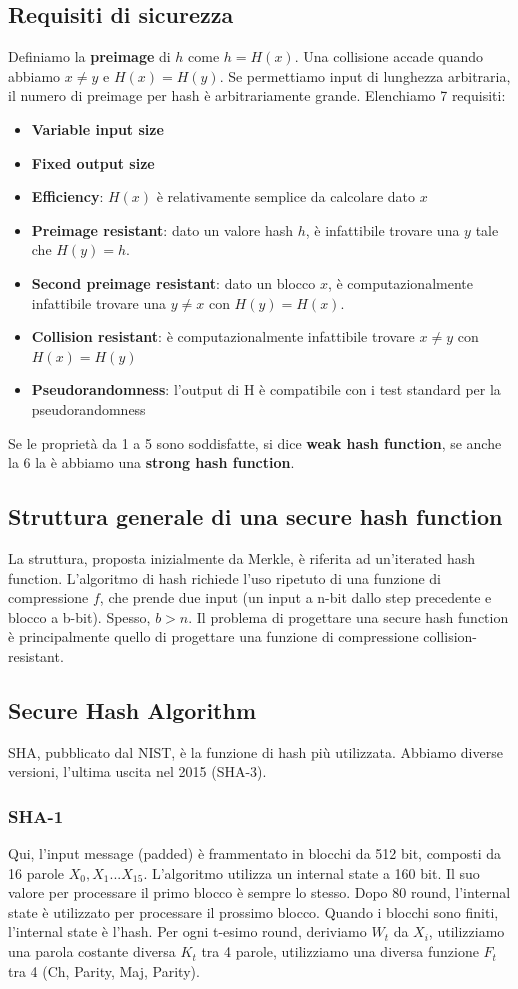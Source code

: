 \documentclass[11pt]{article}
\begin{document}
\subsection{Requisiti di sicurezza}
Definiamo la \textbf{preimage} di $h$ come $h=H(x)$. Una collisione accade quando abbiamo $x \neq y$ e $H(x)=H(y)$. Se permettiamo input di lunghezza arbitraria, il numero di preimage per hash è arbitrariamente grande.
Elenchiamo 7 requisiti:
\begin{itemize}
    \item \textbf{Variable input size}
    \item \textbf{Fixed output size}
    \item \textbf{Efficiency}: $H(x)$ è relativamente semplice da calcolare dato $x$
    \item \textbf{Preimage resistant}: dato un valore hash $h$, è infattibile trovare una $y$ tale che $H(y)=h$.
    \item \textbf{Second preimage resistant}: dato un blocco $x$, è computazionalmente infattibile trovare una $y \neq x$ con $H(y)=H(x)$.
    \item \textbf{Collision resistant}: è computazionalmente infattibile trovare $x \neq y$ con $H(x) = H(y)$
    \item \textbf{Pseudorandomness}: l'output di H è compatibile con i test standard per la pseudorandomness
\end{itemize}
Se le proprietà da 1 a 5 sono soddisfatte, si dice \textbf{weak hash function}, se anche la 6 la è abbiamo una \textbf{strong hash function}.
\subsection{Struttura generale di una secure hash function}
La struttura, proposta inizialmente da Merkle, è riferita ad un'iterated hash function. L'algoritmo di hash richiede l'uso ripetuto di una funzione di compressione $f$, che prende due input (un input a n-bit dallo step precedente e blocco a b-bit). Spesso, $b>n$. Il problema di progettare una secure hash function è principalmente quello di progettare una funzione di compressione collision-resistant.
\subsection{Secure Hash Algorithm}
SHA, pubblicato dal NIST, è la funzione di hash più utilizzata. Abbiamo diverse versioni, l'ultima uscita nel 2015 (SHA-3).
\subsubsection{SHA-1}
Qui, l'input message (padded) è frammentato in blocchi da 512 bit, composti da 16 parole $X_0,X_1...X_{15}$. L'algoritmo utilizza un internal state a 160 bit. Il suo valore per processare il primo blocco è sempre lo stesso. Dopo 80 round, l'internal state è utilizzato per processare il prossimo blocco. Quando i blocchi sono finiti, l'internal state è l'hash. Per ogni t-esimo round, deriviamo $W_t$ da $X_i$, utilizziamo una parola costante diversa $K_t$ tra 4 parole, utilizziamo una diversa funzione $F_t$ tra 4 (Ch, Parity, Maj, Parity). 
\end{document}
